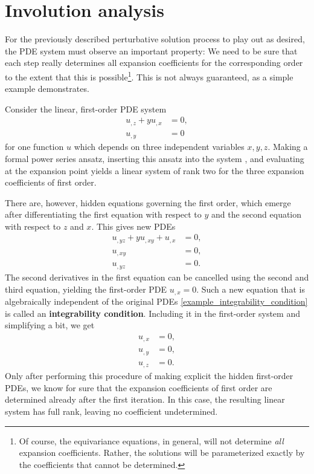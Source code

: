\section{Involution analysis}
For the previously described perturbative solution process to play out as desired, the PDE system must observe an important property: We need to be sure that each step really determines all expansion coefficients for the corresponding order to the extent that this is possible\footnote{Of course, the equivariance equations, in general, will not determine \emph{all} expansion coefficients. Rather, the solutions will be parameterized exactly by the coefficients that cannot be determined.}. This is not always guaranteed, as a simple example demonstrates.
\begin{example}\label{example_involution_1}
  Consider the linear, first-order PDE system
  \begin{equation}\label{example_integrability_condition}
    \begin{aligned}
      u_{,z} + y u_{,x} &{} = 0, \\
      u_{,y} &{} = 0
    \end{aligned}
  \end{equation}
  for one function $u$ which depends on three independent variables $x,y,z$. Making a formal power series ansatz, inserting this ansatz into the system \label{example_integrability_condition}, and evaluating at the expansion point yields a linear system of rank two for the three expansion coefficients of first order.

  There are, however, hidden equations governing the first order, which emerge after differentiating the first equation with respect to $y$ and the second equation with respect to $z$ and $x$. This gives new PDEs
  \begin{equation}
    \begin{aligned}
      u_{,yz} + y u_{,xy} + u_{,x} &{} = 0, \\
      u_{,xy} &{} = 0, \\
      u_{,yz} &{} = 0.
    \end{aligned}
  \end{equation}
  The second derivatives in the first equation can be cancelled using the second and third equation, yielding the first-order PDE $u_{,x} = 0$. Such a new equation that is algebraically independent of the original PDEs \eqref{example_integrability_condition} is called an \textbf{integrability condition}. Including it in the first-order system and simplifying a bit, we get
  \begin{equation}
    \begin{aligned}
      u_{,x} &{} = 0, \\
      u_{,y} &{} = 0, \\
      u_{,z} &{} = 0.
    \end{aligned}
  \end{equation}
  Only after performing this procedure of making explicit the hidden first-order PDEs, we know for sure that the expansion coefficients of first order are determined already after the first iteration. In this case, the resulting linear system has full rank, leaving no coefficient undetermined.
\end{example}
